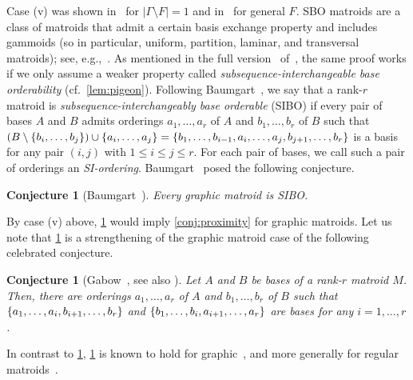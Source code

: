 \documentclass{article}
\DeclarePairedDelimiter{\set}{\{}{\}}
\newtheorem{conjecture}[theorem]{Conjecture}
\theoremstyle{definition}
\begin{document}
Case (v) was shown in~\cite{liu2023congruency} for $|\Gamma \setminus F| = 1$ and in~\cite{horsch2024problems} for general $F$.
SBO matroids are a class of matroids that admit a certain basis exchange property and includes gammoids (so in particular,  uniform, partition, laminar, and transversal matroids); see, e.g.,~\cite[Section~42.6c]{schrijver2003combinatorial}.
As mentioned in the full version~\cite{horsch2024problems_arxiv} of~\cite{horsch2024problems}, the same proof works if we only assume a weaker property called \emph{subsequence-interchangeable base orderability}
(cf.~\cref{lem:pigeon}).
Following Baumgart~\cite{baumgart2009ranking},
we say that a rank-$r$ matroid is \emph{subsequence-interchangeably base orderable} (SIBO) if every pair of bases $A$ and $B$ admits orderings $a_1, \dotsc, a_r$ of $A$ and $b_1, \dotsc, b_r$ of $B$ such that $(B \setminus \{b_i, \dotsc, b_j\}) \cup \{a_i, \dotsc, a_j\} = \set{b_1, \dotsc, b_{i-1}, a_i, \dotsc, a_j, b_{j+1}, \dotsc, b_r}$ is a basis for any pair $(i, j)$ with $1 \le i \le j \le r$. 
For each pair of bases, we call such a pair of orderings an \emph{SI-ordering}.
Baumgart~\cite{baumgart2009ranking} posed the following conjecture.

\begin{conjecture} [{Baumgart~\cite{baumgart2009ranking}}]\label{conj:baumgart}
    Every graphic matroid is SIBO.
\end{conjecture}

By case (v) above, \cref{conj:baumgart} would imply \cref{conj:proximity} for graphic matroids. Let us note that \cref{conj:baumgart} is a strengthening of the graphic matroid case of the following celebrated conjecture.

\begin{conjecture}[{Gabow~\cite{gabow1976decomposing}, see also \cite{wiedemann1984cyclic, cordovil1993bases}}]\label{conj:gabow}
    Let $A$ and $B$ be bases of a rank-$r$ matroid $M$.
    Then, there are orderings $a_1, \dotsc, a_r$ of $A$ and $b_1, \dotsc, b_r$ of $B$ such that $\set{a_1, \dotsc, a_i, b_{i+1}, \dotsc, b_r}$ and $\set{b_1, \dotsc, b_i, a_{i+1}, \dotsc, a_r}$ are bases for any $i = 1, \dotsc, r$.
\end{conjecture}

In contrast to \cref{conj:baumgart}, \cref{conj:gabow} is known to hold for graphic~\cite{wiedemann1984cyclic, kajitani1988ordering, cordovil1993bases}, and more generally for regular matroids~\cite{berczi2023reconfiguration}.
\end{document}
